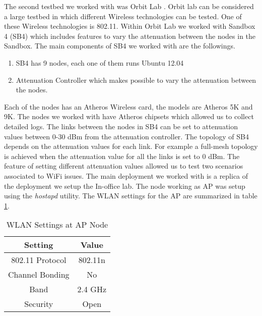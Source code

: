 The second testbed we worked with was Orbit Lab \cite{orbit2005}. Orbit lab can be considered a large testbed in which different Wireless technologies can be tested. One of these Wireless technologies is 802.11. Within Orbit Lab we worked with Sandbox 4 (SB4) which includes features to vary the attenuation between the nodes in the Sandbox. The main components of SB4 we worked with are the followings.

\begin{enumerate}
	\item SB4 has 9 nodes, each one of them runs Ubuntu 12.04
	\item Attenuation Controller which makes possible to vary the attenuation between the nodes.
\end{enumerate}

Each of the nodes has an Atheros Wireless card, the models are Atheros 5K and 9K. The nodes we worked with have Atheros chipsets which allowed us to collect detailed logs. The links between the nodes in SB4 can be set to attenuation values between 0-30 dBm from the attenuation controller. The topology of SB4 depends on the attenuation values for each link. For example a full-mesh topology is achieved when the attenuation value for all the links is set to 0 dBm. The feature of setting different attenuation values allowed us to test two scenarios associated to WiFi issues. The main deployment we worked with is a replica of the deployment we setup the In-office lab. The node working as AP was setup using the \emph{hostapd} utility. The WLAN settings for the AP are summarized in table \ref{table:WLAN_Settings_AP_Node}.

\begin{table}[h]
	\begin{center}
		\begin{tabular}{||c c||}
			\hline
			Setting & Value\\ [0.5ex] 
			\hline\hline
			802.11 Protocol & 802.11n\\ 
			\hline
			Channel Bonding & No\\
			\hline
			Band & 2.4 GHz\\
			\hline
			Security & Open\\ [1ex] 
			\hline
		\end{tabular}
	\end{center}
\caption{WLAN Settings at AP Node}
\label{table:WLAN_Settings_AP_Node}
\end{table} 




